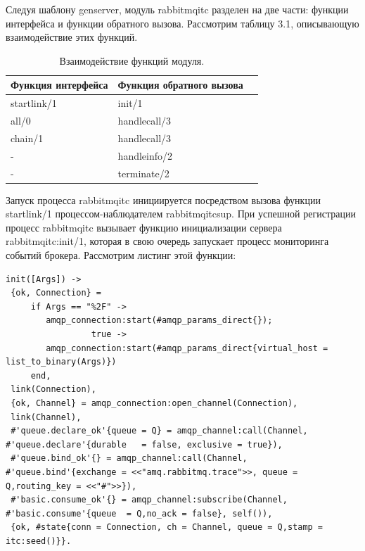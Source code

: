 Следуя шаблону gen\underline{\hspace{0.25cm}}server, модуль rabbitmq\underline{\hspace{0.25cm}}itc разделен на две части: функции интерфейса и функции обратного вызова. Рассмотрим таблицу 3.1, описывающую взаимодействие этих функций.
\begin{table}
\centering
\caption{\label{tab:widgets} Взаимодействие функций модуля.}
\begin{tabular}{llr}
\cmidrule(r){1-2}
Функция интерфейса  & Функция обратного вызова   \\
\midrule
start\underline{\hspace{0.25cm}}link/1      & init/1   \\
all/0   & handle\underline{\hspace{0.25cm}}call/3\\
chain/1 &handle\underline{\hspace{0.25cm}}call/3\\
- & handle\underline{\hspace{0.25cm}}info/2\\
- & terminate/2\\
\bottomrule
\end{tabular}
\end{table}
Запуск процесса rabbitmq\underline{\hspace{0.25cm}}itc инициируется посредством вызова функции start\underline{\hspace{0.25cm}}link/1 процессом-наблюдателем rabbitmq\underline{\hspace{0.25cm}}itc\underline{\hspace{0.25cm}}sup. При успешной регистрации процесс rabbitmq\underline{\hspace{0.25cm}}itc вызывает функцию инициализации сервера rabbitmq\underline{\hspace{0.25cm}}itc:init/1, которая в свою очередь запускает процесс мониторинга событий брокера. Рассмотрим листинг этой функции: 
\begin{lstlisting}
init([Args]) ->
 {ok, Connection} = 
     if Args == "%2F" ->
        amqp_connection:start(#amqp_params_direct{});
                 true ->
        amqp_connection:start(#amqp_params_direct{virtual_host = list_to_binary(Args)})
     end,
 link(Connection),
 {ok, Channel} = amqp_connection:open_channel(Connection),
 link(Channel),
 #'queue.declare_ok'{queue = Q} = amqp_channel:call(Channel, #'queue.declare'{durable   = false, exclusive = true}),
 #'queue.bind_ok'{} = amqp_channel:call(Channel, #'queue.bind'{exchange = <<"amq.rabbitmq.trace">>, queue = Q,routing_key = <<"#">>}),
 #'basic.consume_ok'{} = amqp_channel:subscribe(Channel, #'basic.consume'{queue  = Q,no_ack = false}, self()),
 {ok, #state{conn = Connection, ch = Channel, queue = Q,stamp = itc:seed()}}.
\end{lstlisting}

